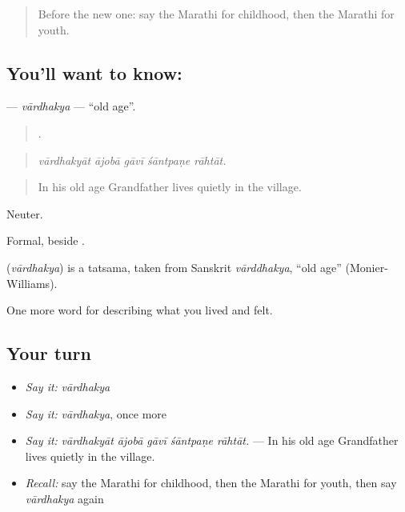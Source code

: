 \label{lesson:MR-C498-vardhakya}



\begin{quote}
Before the new one: say the Marathi for childhood, then the Marathi for youth.
\end{quote}

\subsection*{You'll want to know: }
\textbf{} — \emph{vārdhakya} — \textquotedblleft{}old age\textquotedblright{}.

\begin{quote}
    .
\end{quote}

\begin{quote}
\emph{vārdhakyāt ājobā gāvī śāntpaṇe rāhtāt.}
\end{quote}

\begin{quote}
In his old age Grandfather lives quietly in the village.
\end{quote}

Neuter.

Formal, beside .

\begin{cousinweb}
\textbf{} (\emph{vārdhakya}) is a tatsama, taken from Sanskrit \emph{vārddhakya}, \textquotedblleft{}old age\textquotedblright{} (Monier-Williams).
\end{cousinweb}

\begin{grammarlens}[title={What you've built}]
One more word for describing what you lived and felt.
\end{grammarlens}

\subsection*{Your turn}
\begin{itemize}
\raggedright
  \item \emph{Say it:} \emph{vārdhakya}
  \item \emph{Say it:} \emph{vārdhakya}, once more
  \item \emph{Say it:} \emph{vārdhakyāt ājobā gāvī śāntpaṇe rāhtāt.} — In his old age Grandfather lives quietly in the village.
  \item \emph{Recall:} say the Marathi for childhood, then the Marathi for youth, then say \emph{vārdhakya} again
\end{itemize}

